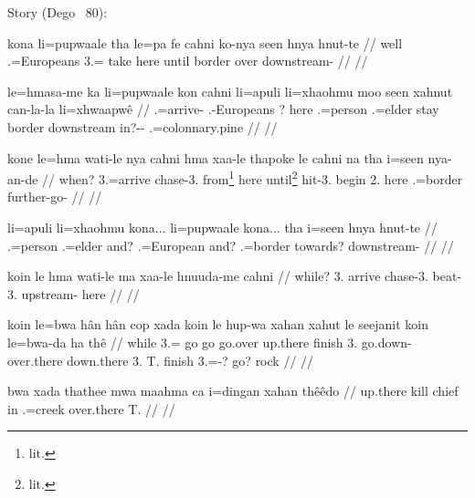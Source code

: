 \xe

Story (Dego ~80):

\pex
\a
\begingl
\gla kona li=pupwaale tha le=pa fe cahni ko-nya seen hnya hnut-te
// \glb well .=Europeans  3.= take here until border over downstream-
// \glft {}
// \endgl

\a
\begingl
\gla le=hmasa-me ka li=pupwaale kon cahni li=apuli li=xhaohmu moo seen xahnut can-la-la li=xhwaapwê
// .=arrive-  .-Europeans ? here .=person .=elder stay border downstream in?-- .=colonnary.pine
// \glft {}
// \endgl

\a
\begingl
\gla kone le=hma wati-le nya cahni hma xaa-le thapoke le cahni na tha i=seen nya-an-de
// \glb when? 3.=arrive chase-3. from\footnote{lit. } here until\footnote{lit. } hit-3. begin 2. here   .=border further-go-
// \glft {}
// \endgl

\a
\begingl
\gla li=apuli li=xhaohmu kona... li=pupwaale kona... tha i=seen hnya hnut-te
// \glb {}.=person .=elder and? .=European and?  .=border towards? downstream-
// \glft {}
// \endgl

\a
\begingl
\gla koin le hma wati-le ma xaa-le hnuuda-me cahni
// \glb while? 3. arrive chase-3. beat-3. upstream- here
// \glft {}
// \endgl

\a
\begingl
\gla koin le=bwa hân hân cop xada koin le hup-wa xahan xahut le seejanit koin le=bwa-da ha thê
// \glb while 3.= go go go.over up.there finish 3. go.down- over.there down.there 3. T. finish 3.=-? go? rock
// \glft {} 
// \endgl

\a\label{ex:thathe1}
\begingl
\gla bwa xada thathee mwa maahma ca i=dingan xahan thêêdo
// \glb {} up.there kill  chief in .=creek over.there T.
// \glft {}
// \endgl

